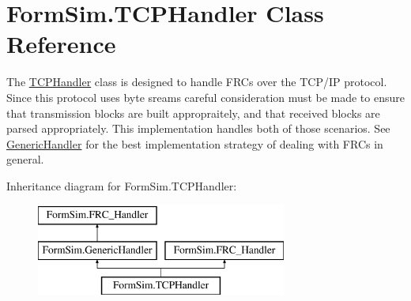 \hypertarget{class_form_sim_1_1_t_c_p_handler}{}\section{Form\+Sim.\+T\+C\+P\+Handler Class Reference}
\label{class_form_sim_1_1_t_c_p_handler}


The \mbox{\hyperlink{class_form_sim_1_1_t_c_p_handler}{T\+C\+P\+Handler}} class is designed to handle F\+R\+Cs over the T\+C\+P/\+IP protocol. Since this protocol uses byte sreams careful consideration must be made to ensure that transmission blocks are built appropraitely, and that received blocks are parsed appropriately. This implementation handles both of those scenarios. See \mbox{\hyperlink{class_form_sim_1_1_generic_handler}{Generic\+Handler}} for the best implementation strategy of dealing with F\+R\+Cs in general.  


Inheritance diagram for Form\+Sim.\+T\+C\+P\+Handler\+:\begin{figure}[H]
\begin{center}
\leavevmode
\includegraphics[height=3.000000cm]{class_form_sim_1_1_t_c_p_handler}
\end{center}
\end{figure}
